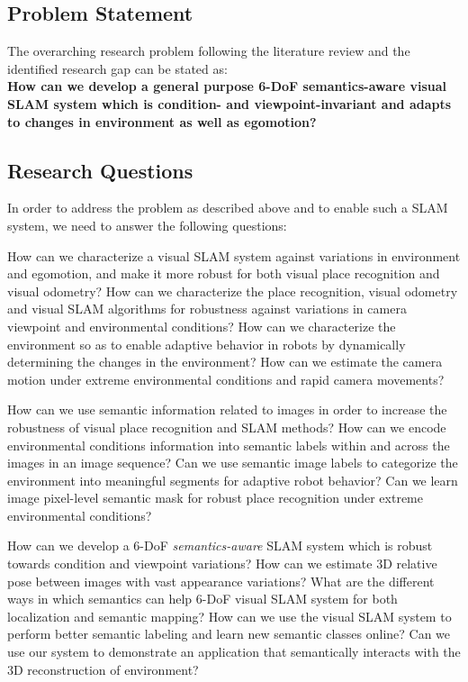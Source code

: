 \documentclass{article}
\begin{document}
\subsection{Problem Statement}

The overarching research problem following the literature review and the identified research gap can be stated as: \\
\textbf{How can we develop a general purpose 6-DoF semantics-aware visual SLAM system which is condition- and viewpoint-invariant and adapts to changes in environment as well as egomotion?}


\subsection{Research Questions}

In order to address the problem as described above and to enable such a SLAM system, we need to answer the following questions:
\begin{outline}
 \1 How can we characterize a visual SLAM system against variations in environment and egomotion, and make it more robust for both visual place recognition and visual odometry?
 \2 How can we characterize the place recognition, visual odometry and visual SLAM algorithms for robustness against variations in camera viewpoint and environmental conditions?
 \2 How can we characterize the environment so as to enable adaptive behavior in robots by dynamically determining the changes in the environment?
 \2 How can we estimate the camera motion under extreme environmental conditions and rapid camera movements?
 
 \1 How can we use semantic information related to images in order to increase the robustness of visual place recognition and SLAM methods?
 \2 How can we encode environmental conditions information into semantic labels within and across the images in an image sequence?
 \2 Can we use semantic image labels to categorize the environment into meaningful segments for adaptive robot behavior?
 \2 Can we learn image pixel-level semantic mask for robust place recognition under extreme environmental conditions?
 
 \1 How can we develop a 6-DoF \emph{semantics-aware} SLAM system which is robust towards condition and viewpoint variations?
 \2 How can we estimate 3D relative pose between images with vast appearance variations?
 \2 What are the different ways in which semantics can help 6-DoF visual SLAM system for both localization and semantic mapping?
 \2 How can we use the visual SLAM system to perform better semantic labeling and learn new semantic classes online?
 \2 Can we use our system to demonstrate an application that semantically interacts with the 3D reconstruction of environment?
 
\end{outline}
\end{document}
